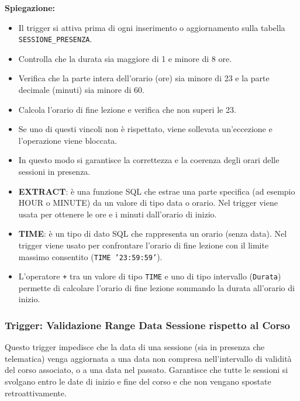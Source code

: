 \textbf{Spiegazione:}
\begin{itemize} 
    \item Il trigger si attiva prima di ogni inserimento o aggiornamento sulla tabella \texttt{SESSIONE\_PRESENZA}. 
    \item Controlla che la durata sia maggiore di 1 e minore di 8 ore. 
    \item Verifica che la parte intera dell'orario (ore) sia minore di 23 e la parte decimale (minuti) sia minore di 60. 
    \item Calcola l'orario di fine lezione e verifica che non superi le 23. 
    \item Se uno di questi vincoli non è rispettato, viene sollevata un'eccezione e l'operazione viene bloccata. 
    \item In questo modo si garantisce la correttezza e la coerenza degli orari delle sessioni in presenza.
    \item \textbf{EXTRACT}: è una funzione SQL che estrae una parte specifica (ad esempio HOUR o MINUTE) da un valore di tipo data o orario. Nel trigger viene usata per ottenere le ore e i minuti dall'orario di inizio. \item \textbf{TIME}: è un tipo di dato SQL che rappresenta un orario (senza data). Nel trigger viene usato per confrontare l'orario di fine lezione con il limite massimo consentito (\texttt{TIME '23:59:59'}). 
    \item L'operatore \texttt{+} tra un valore di tipo \texttt{TIME} e uno di tipo intervallo (\texttt{Durata}) permette di calcolare l'orario di fine lezione sommando la durata all'orario di inizio. 
\end{itemize}

\subsubsection{Trigger: Validazione Range Data Sessione rispetto al Corso}

Questo trigger impedisce che la data di una sessione (sia in presenza che telematica) venga aggiornata a una data non compresa nell’intervallo di validità del corso associato, o a una data nel passato. Garantisce che tutte le sessioni si svolgano entro le date di inizio e fine del corso e che non vengano spostate retroattivamente.

